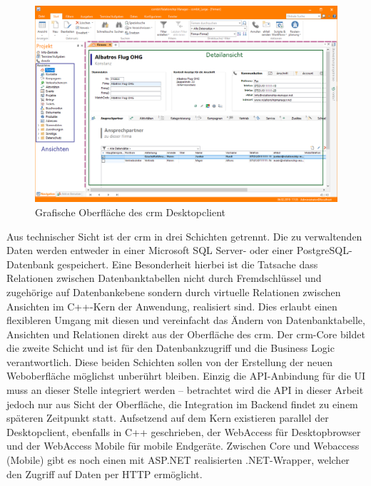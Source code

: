 \begin{figure}
    \centering
    \captionsetup{justification=centering}
    \includegraphics[width=\textwidth]{figures/crm_ui.png}
        \caption{Grafische Oberfläche des \gls{crm} Desktopclient}
        \label{fig:crm_ui}
\end{figure}

Aus technischer Sicht ist der \gls{crm} in drei Schichten getrennt. Die zu verwaltenden Daten werden entweder in einer Microsoft SQL Server- oder einer PostgreSQL-Datenbank gespeichert. Eine Besonderheit hierbei ist die Tatsache dass Relationen zwischen Datenbanktabellen nicht durch Fremdschlüssel und zugehörige auf Datenbankebene sondern durch virtuelle Relationen zwischen Ansichten im C++-Kern der Anwendung, realisiert sind. Dies erlaubt einen flexibleren Umgang mit diesen und vereinfacht das Ändern von Datenbanktabelle, Ansichten und Relationen direkt aus der Oberfläche des \gls{crm}.
Der \gls{crm}-Core bildet die zweite Schicht und ist für den Datenbankzugriff und die Business Logic  verantwortlich. Diese beiden Schichten sollen von der Erstellung der neuen Weboberfläche möglichst unberührt bleiben. Einzig die API-Anbindung für die UI muss an dieser Stelle integriert werden -- betrachtet wird die API in dieser Arbeit jedoch nur aus Sicht der Oberfläche, die Integration im Backend findet zu einem späteren Zeitpunkt statt.
Aufsetzend auf dem Kern existieren parallel der Desktopclient, ebenfalls in C++ geschrieben, der WebAccess für Desktopbrowser und der WebAccess Mobile für mobile Endgeräte. Zwischen Core und Webaccess (Mobile) gibt es noch einen mit ASP.NET  realisierten .NET-Wrapper, welcher den Zugriff auf Daten per HTTP ermöglicht.


